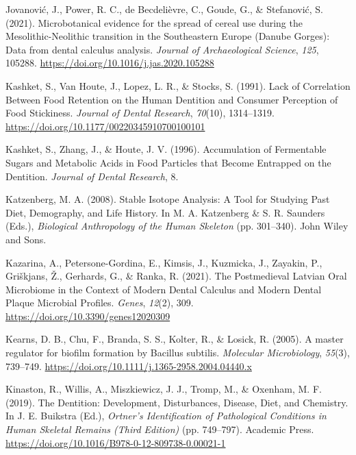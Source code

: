 \documentclass[
  letterpaper,
]{book}
\newlength{\cslhangindent}
\newlength{\cslentryspacingunit} %
\newenvironment{CSLReferences}[2] %
 {%
  \setlength{\parindent}{0pt}
  \ifodd #1
  \let\oldpar\par
  \def\par{\hangindent=\cslhangindent\oldpar}
  \fi
  \setlength{\parskip}{#2\cslentryspacingunit}
 }%
 {}
\begin{document}
\begin{CSLReferences}{1}{0}
\leavevmode{}%
Jovanović, J., Power, R. C., de Becdelièvre, C., Goude, G., \&
Stefanović, S. (2021). Microbotanical evidence for the spread of cereal
use during the {Mesolithic-Neolithic} transition in the {Southeastern
Europe} ({Danube Gorges}): {Data} from dental calculus analysis.
\emph{Journal of Archaeological Science}, \emph{125}, 105288.
\url{https://doi.org/10.1016/j.jas.2020.105288}

\leavevmode{}%
Kashket, S., Van Houte, J., Lopez, L. R., \& Stocks, S. (1991). Lack of
{Correlation Between Food Retention} on the {Human Dentition} and
{Consumer Perception} of {Food Stickiness}. \emph{Journal of Dental
Research}, \emph{70}(10), 1314--1319.
\url{https://doi.org/10.1177/00220345910700100101}

\leavevmode{}%
Kashket, S., Zhang, J., \& Houte, J. V. (1996). Accumulation of
{Fermentable Sugars} and {Metabolic Acids} in {Food Particles} that
{Become Entrapped} on the {Dentition}. \emph{Journal of Dental
Research}, 8.

\leavevmode{}%
Katzenberg, M. A. (2008). Stable {Isotope Analysis}: {A Tool} for
{Studying Past Diet}, {Demography}, and {Life History}. In M. A.
Katzenberg \& S. R. Saunders (Eds.), \emph{Biological {Anthropology} of
the {Human Skeleton}} (pp. 301--340). {John Wiley and Sons}.

\leavevmode{}%
Kazarina, A., Petersone-Gordina, E., Kimsis, J., Kuzmicka, J., Zayakin,
P., Griškjans, Ž., Gerhards, G., \& Ranka, R. (2021). The {Postmedieval
Latvian Oral Microbiome} in the {Context} of {Modern Dental Calculus}
and {Modern Dental Plaque Microbial Profiles}. \emph{Genes},
\emph{12}(2), 309. \url{https://doi.org/10.3390/genes12020309}

\leavevmode{}%
Kearns, D. B., Chu, F., Branda, S. S., Kolter, R., \& Losick, R. (2005).
A master regulator for biofilm formation by {Bacillus} subtilis.
\emph{Molecular Microbiology}, \emph{55}(3), 739--749.
\url{https://doi.org/10.1111/j.1365-2958.2004.04440.x}

\leavevmode{}%
Kinaston, R., Willis, A., Miszkiewicz, J. J., Tromp, M., \& Oxenham, M.
F. (2019). The {Dentition}: {Development}, {Disturbances}, {Disease},
{Diet}, and {Chemistry}. In J. E. Buikstra (Ed.), \emph{Ortner's
{Identification} of {Pathological Conditions} in {Human Skeletal
Remains} ({Third Edition})} (pp. 749--797). {Academic Press}.
\url{https://doi.org/10.1016/B978-0-12-809738-0.00021-1}


\end{CSLReferences}
\end{document}
